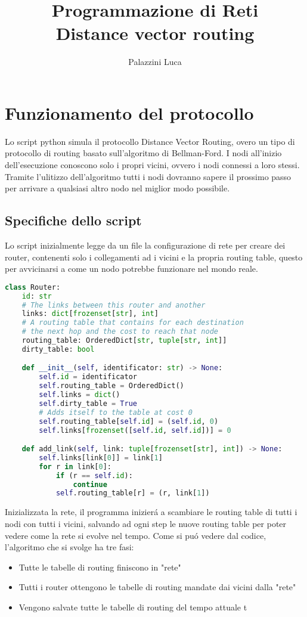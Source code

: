 \documentclass[12pt]{article}
\title{Programmazione di Reti \\ Distance vector routing}
\author{Palazzini Luca}
\begin{document}
\maketitle
\section{Funzionamento del protocollo}
Lo script python simula il protocollo Distance Vector Routing, overo un tipo di protocollo di routing basato sull'algoritmo di Bellman-Ford.
%
I nodi all'inizio dell'esecuzione conoscono solo i propri vicini, ovvero i nodi connessi a loro stessi.
%
Tramite l'ulitizzo dell'algoritmo tutti i nodi dovranno sapere il prossimo passo per arrivare a qualsiasi altro nodo nel miglior modo possibile.
\subsection{Specifiche dello script}
Lo script inizialmente legge da un file la configurazione di rete per creare dei router, contenenti solo i collegamenti ad i vicini e la propria routing table, questo per avvicinarsi a come un nodo potrebbe funzionare nel mondo reale.
\begin{lstlisting}[language=Python, caption=Classe del router]
class Router:
    id: str
    # The links between this router and another
    links: dict[frozenset[str], int]
    # A routing table that contains for each destination
    # the next hop and the cost to reach that node
    routing_table: OrderedDict[str, tuple[str, int]]
    dirty_table: bool

    def __init__(self, identificator: str) -> None:
        self.id = identificator
        self.routing_table = OrderedDict()
        self.links = dict()
        self.dirty_table = True
        # Adds itself to the table at cost 0
        self.routing_table[self.id] = (self.id, 0)
        self.links[frozenset([self.id, self.id])] = 0

    def add_link(self, link: tuple[frozenset[str], int]) -> None:
        self.links[link[0]] = link[1]
        for r in link[0]:
            if (r == self.id):
                continue
            self.routing_table[r] = (r, link[1])
\end{lstlisting}
Inizializzata la rete, il programma inizierá a scambiare le routing table di tutti i nodi con tutti i vicini, salvando ad ogni step le nuove routing table per poter vedere come la rete si evolve nel tempo.
Come si puó vedere dal codice, l'algoritmo che si svolge ha tre fasi:
\begin{itemize}
\item Tutte le tabelle di routing finiscono in "rete"
\item Tutti i router ottengono le tabelle di routing mandate dai vicini dalla "rete"
\item Vengono salvate tutte le tabelle di routing del tempo attuale t
\end{itemize}
\end{document}
